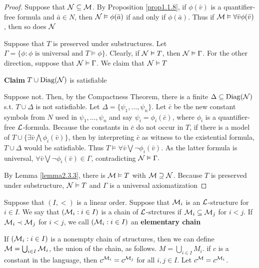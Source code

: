 \documentclass[11pt]{article}
\begin{document}
\begin{proof}
Suppose that \(\mathcal{N}\subseteq\mathcal{M}\). By Proposition \ref{prop1.1.8}, if
\(\phi(\bar{v})\) is a quantifier-free formula and \(\bar{a}\in N\), then
\(\mathcal{N}\vDash\phi(\bar{a})\) if and only if \(\phi(\bar{a})\). Thus if
\(\mathcal{M}\vDash\forall\bar{v}\phi(\bar{v})\), then so does \(\mathcal{N}\)

Suppose that \(T\) is preserved under substructures. Let
\(\Gamma=\{\phi:\phi\text{ is universal and }T\vDash\phi\}\). Clearly, if
\(\mathcal{N}\vDash T\), then \(\mathcal{N}\vDash\Gamma\). For the other direction,
suppose that \(\mathcal{N}\vDash\Gamma\). We claim that \(\mathcal{N}\vDash T\)

\textbf{Claim} \(T\cup\operatorname{Diag}(\mathcal{N})\) is satisfiable

Suppose not. Then, by the Compactness Theorem, there is a finite
\(\Delta\subseteq\operatorname{Diag}(\mathcal{N})\) s.t. \(T\cup\Delta\) is not satisfiable. Let
\(\Delta=\{\psi_1,\dots,\psi_n\}\). Let \(\bar{c}\) be the new constant
symbols from \(N\) used in \(\psi_1,\dots,\psi_n\) and say
\(\psi_i=\phi_i(\bar{c})\), where \(\phi_i\) is a quantifier-free
\(\mathcal{L}\)-formula. Because the constants in \(\bar{c}\) do not occur in \(T\), if
there is a model of \(T\cup\{\exists\bar{v}\bigwedge\phi_i(\bar{v})\}\), then
by interpreting \(\bar{c}\) as witness to the existential formula,
\(T\cup\Delta\) would be satisfiable. Thus
\(T\vDash\forall\bar{v}\bigvee\neg\phi_i(\bar{v})\). As the latter formula
is universal, \(\forall\bar{v}\bigvee\neg\phi_i(\bar{v})\in\Gamma\),
contradicting \(\mathcal{N}\vDash\Gamma.\)

By Lemma \ref{lemma2.3.3}, there is \(\mathcal{M}\vDash T\) with
\(\mathcal{M}\supseteq\mathcal{N}\). Because \(T\) is preserved under substructure,
\(\mathcal{N}\vDash T\) and \(\Gamma\) is a universal axiomatization
\end{proof}

\begin{definition}[]
Suppose that \((I,<)\) is a linear order. Suppose that \(\mathcal{M}_i\) is an
\(\mathcal{L}\)-structure for \(i\in I\). We say that \((\mathcal{M}_i:i\in I)\) is a
chain of \(\mathcal{L}\)-strctures if \(\mathcal{M}_i\subseteq\mathcal{M}_j\) for \(i<j\). If
\(\mathcal{M}_i\prec\mathcal{M}_j\) for \(i<j\), we call \((\mathcal{M}_i:i\in I)\) an 
\textbf{elementary chain}
\end{definition}

If \((\mathcal{M}_i:i\in I)\) is a nonempty chain of structures, then we can define
\(\mathcal{M}=\bigcup_{i\in I}\mathcal{M}_i\), the union of the chain, as follows. 
\(M=\bigcup_{i\in I}M_i\). if \(c\) is a constant in the language, then
\(c^{\mathcal{M}_i}=c^{\mathcal{M}_j}\) for all \(i,j\in I\). Let
\(c^{\mathcal{M}}=c^{\mathcal{M}_i}\).
\end{document}
